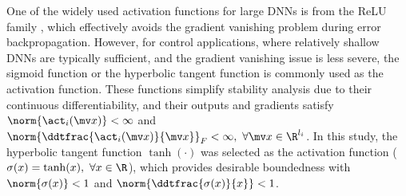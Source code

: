 \documentclass[lettersize,journal]{IEEEtran}
\begin{document}
One of the widely used activation functions for large DNNs is from the ReLU family \cite{Maas:2013aa}, which effectively avoids the gradient vanishing problem during error backpropagation. 
However, for control applications, where relatively shallow DNNs are typically sufficient, and the gradient vanishing issue is less severe, the sigmoid function or the hyperbolic tangent function is commonly used as the activation function. 
These functions simplify stability analysis due to their continuous differentiability, and their outputs and gradients satisfy $\norm{\act_i(\mv x)} < \infty$ and  $\norm{\ddtfrac{\act_i(\mv x)}{\mv x}}_F < \infty,\ \forall\mv x\in\R^{l_i}$. 
In this study, the hyperbolic tangent function $\tanh(\cdot)$ was selected as the activation function (\ie $\sigma(x) = \tanh(x),\ \forall x\in\R$), which provides desirable boundedness with $\norm{\sigma(x)}<1$ and $\norm{\ddtfrac{\sigma(x)}{x}}< 1$.
\end{document}

